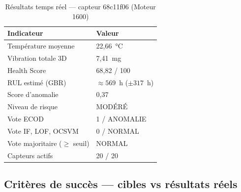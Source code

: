 \documentclass[12pt,a4paper]{report}
\begin{document}
\begin{table}[h]
\centering
\caption{Résultats temps réel — capteur 68c11f06 (Moteur 1600)}
\begin{tabular}{ll}
\toprule
\textbf{Indicateur} & \textbf{Valeur} \\
\midrule
Température moyenne      & 22,66~°C \\
Vibration totale 3D      & 7,41~mg \\
Health Score             & 68,82 / 100 \\
RUL estimé (GBR)         & $\approx 569$~h ($\pm 317$~h) \\
Score d'anomalie         & 0,37 \\
Niveau de risque         & MODÉRÉ \\
Vote ECOD                & 1 / ANOMALIE \\
Vote IF, LOF, OCSVM      & 0 / NORMAL \\
Vote majoritaire ($\geq$ seuil) & NORMAL \\
Capteurs actifs          & 20 / 20 \\
\bottomrule
\end{tabular}
\end{table}

\subsection{Critères de succès — cibles vs résultats réels}
\end{document}
